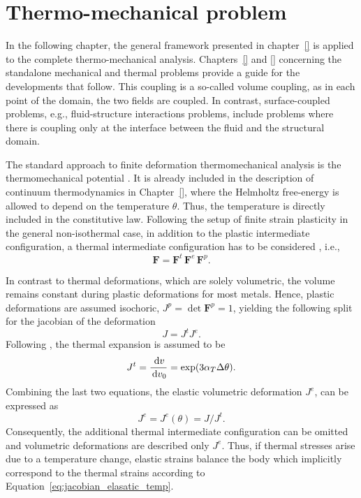 \chapter{Thermo-mechanical problem}
\label{chapter:thermo_mechanical_problem}

In the following chapter, the general framework presented in chapter~\ref{} is applied to the complete thermo-mechanical analysis.
Chapters~\ref{} and \ref{} concerning the standalone mechanical and thermal problems provide a guide for the developments that follow.
This coupling is a so-called volume coupling, as in each point of the domain, the two fields are coupled.
In contrast, surface-coupled problems, e.g., fluid-structure interactions problems, include problems where there is coupling only at the interface between the fluid and the structural domain.

The standard approach to finite deformation thermomechanical analysis is the thermomechanical potential \cite{}.
It is already included in the description of continuum thermodynamics in Chapter~\ref{}, where the Helmholtz free-energy is allowed to depend on the temperature \(\theta\).
Thus, the temperature is directly included in the constitutive law.
Following the setup of finite strain plasticity in the general non-isothermal case, in addition to the plastic intermediate configuration, a thermal intermediate configuration has to be considered \cite{}, i.e.,
\begin{equation}
  \bm F = \bm F^t\,\bm F^e\,\bm F^p.
\end{equation}

In contrast to thermal deformations, which are solely volumetric, the volume remains constant during plastic deformations for most metals.
Hence, plastic deformations are assumed isochoric, \(J^p = \operatorname{det}\bm F^p=1\), yielding the following split for the jacobian of the deformation
\begin{equation}
  J = J^t J^e.
\end{equation}
Following \cite{danowski_computational_2014}, the thermal expansion is assumed to be
\begin{equation}
  J^t = \frac{\,\mathrm{d} v}{\,\mathrm{d} v_0} = \operatorname{exp}(3\alpha_T \Delta\theta).
\end{equation}
Combining the last two equations, the elastic volumetric deformation \(J^e\), can be expressed as
\begin{equation} \label{eq:jacobian_elasatic_temp}
  J^e  = J^e(\theta) = J/J^t.
\end{equation}
Consequently, the additional thermal intermediate configuration can be omitted and volumetric deformations are described only \(J^e\).
Thus, if thermal stresses arise due to a temperature change, elastic strains balance the body which implicitly correspond to the thermal strains according to Equation~\eqref{eq:jacobian_elasatic_temp}.

